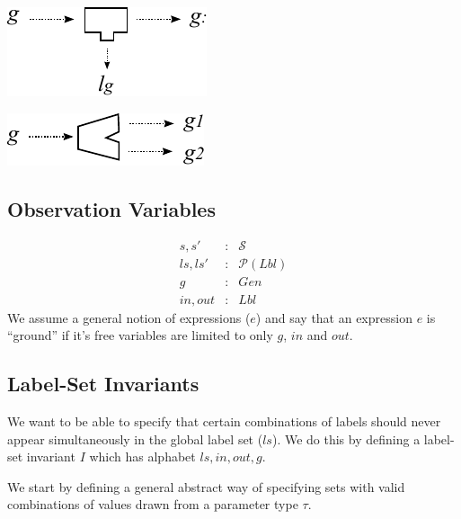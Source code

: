 \includegraphics{images/new-label}

\includegraphics{images/split-gen}


\subsection{Observation Variables}

\begin{eqnarray*}
   s, s' &:& \mathcal S
\\ ls, ls' &:& \mathcal P (Lbl)
\\ g &:& Gen
\\ in, out &:& Lbl
\end{eqnarray*}
We assume a general notion of expressions ($e$)
and say that an expression $e$ is ``ground''
if it's free variables are limited to only $g$, $in$ and $out$.


\subsection{Label-Set Invariants}


We want to be able to specify that certain combinations
of labels should never appear simultaneously
in the global label set ($ls$).
We do this by defining a label-set invariant $I$
which has alphabet $ls,in,out,g$.

We start by defining a general abstract way of specifying
sets with valid combinations
of values drawn from a parameter type $\tau$.

